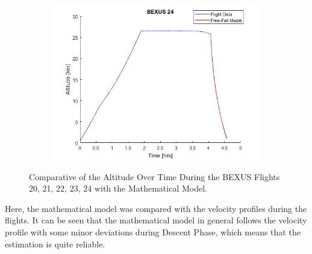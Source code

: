 \documentclass[a4paper,12pt,twoside]{article}
\begin{document}
\begin{appendices}
\begin{figure}[H]
\begin{subfigure}{0.45\textwidth}
    \centering\includegraphics[width=1.1\textwidth]{appendix/img/bexus24mathmodel.png}
  \end{subfigure}
  \caption{Comparative of the Altitude Over Time During the BEXUS Flights 20, 21, 22, 23, 24 with the Mathematical Model.}\label{fig:bexustrajectories}
  \end{figure}

 
 
\bigskip
{}

\smallskip
Here, the mathematical model was compared with the velocity profiles during the flights. It can be seen that the mathematical model in general follows the velocity profile with some minor deviations during Descent Phase, which means that the estimation is quite reliable.


\end{appendices}
\end{document}
